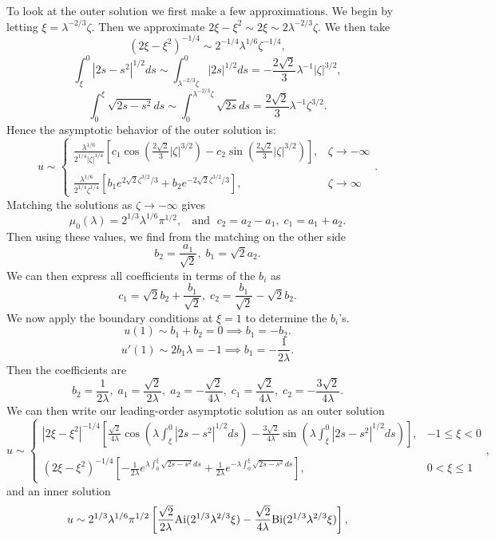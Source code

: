 To look at the outer solution we first make a few approximations. We begin by letting $\xi=\lambda^{-2/3}\zeta.$ Then we approximate $2\xi-\xi^2\sim2\xi\sim2\lambda^{-2/3}\zeta.$ We then take
$$(2\xi-\xi^2)^{-1/4}\sim2^{-1/4}\lambda^{1/6}\zeta^{-1/4},$$
$$\int_\xi^0|2s-s^2|^{1/2}ds\sim\int_{\lambda^{-2/3}\zeta}^0|2s|^{1/2}ds=-\frac{2\sqrt{2}}{3}\lambda^{-1}|\zeta|^{3/2},$$
$$\int_0^\xi\sqrt{2s-s^2}ds\sim\int_0^{\lambda^{-2/3}\zeta}\sqrt{2s}ds=\frac{2\sqrt{2}}{3}\lambda^{-1}\zeta^{3/2}.$$
Hence the asymptotic behavior of the outer solution is:
$$u\sim\left\{\begin{array}{cc}\frac{\lambda^{1/6}}{2^{1/4}|\zeta|^{1/4}}\left[c_1\cos\left(\frac{2\sqrt{2}}{3}|\zeta|^{3/2}\right)-c_2\sin\left(\frac{2\sqrt{2}}{3}|\zeta|^{3/2}\right)\right],&\zeta\to-\infty\\ \\
\frac{\lambda^{1/6}}{2^{1/4}\zeta^{1/4}}\left[b_1e^{2\sqrt{2}\zeta^{3/2}/3}+b_2e^{-2\sqrt{2}\zeta^{3/2}/3}\right],&\zeta\to\infty\end{array}\right..$$
Matching the solutions as $\zeta\to-\infty$ gives
$$\mu_0(\lambda)=2^{1/3}\lambda^{1/6}\pi^{1/2},\;\;\text{ and }\;c_2=a_2-a_1,\;c_1=a_1+a_2.$$
Then using these values, we find from the matching on the other side
$$b_2=\frac{a_1}{\sqrt{2}},\;b_1=\sqrt{2}a_2.$$
We can then express all coefficients in terms of the $b_i$ as
$$c_1=\sqrt{2}b_2+\frac{b_1}{\sqrt{2}},\;c_2=\frac{b_1}{\sqrt{2}}-\sqrt{2}b_2.$$
We now apply the boundary conditions at $\xi=1$ to determine the $b_i$'s.
$$u(1)\sim b_1+b_2=0\implies b_1=-b_2.$$
$$u'(1)\sim 2b_1\lambda=-1\implies b_1=-\frac{1}{2\lambda}.$$
Then the coefficients are
$$b_2=\frac{1}{2\lambda},\;a_1=\frac{\sqrt{2}}{2\lambda},\;a_2=-\frac{\sqrt{2}}{4\lambda},\;c_1=\frac{\sqrt{2}}{4\lambda},\;c_2=-\frac{3\sqrt{2}}{4\lambda}.$$
We can then write our leading-order asymptotic solution as an outer solution
$$u\sim\left\{\begin{array}{cc}|2\xi-\xi^2|^{-1/4}\left[\frac{\sqrt{2}}{4\lambda}\cos\left(\lambda\int_\xi^0|2s-s^2|^{1/2}ds\right)-\frac{3\sqrt{2}}{4\lambda}\sin\left(\lambda\int_\xi^0|2s-s^2|^{1/2}ds\right)\right],&-1\leq\xi<0\\ \\ (2\xi-\xi^2)^{-1/4}\left[-\frac{1}{2\lambda}e^{\lambda\int_0^\xi\sqrt{2s-s^2}ds}+\frac{1}{2\lambda}e^{-\lambda\int_0^\xi\sqrt{2s-s^2}ds}\right],&0<\xi\leq 1\end{array}\right.,$$
and an inner solution
$$u\sim 2^{1/3}\lambda^{1/6}\pi^{1/2}\left[\frac{\sqrt{2}}{2\lambda}{\rm Ai}(2^{1/3}\lambda^{2/3}\xi)-\frac{\sqrt{2}}{4\lambda}{\rm Bi}(2^{1/3}\lambda^{2/3}\xi)\right],$$
